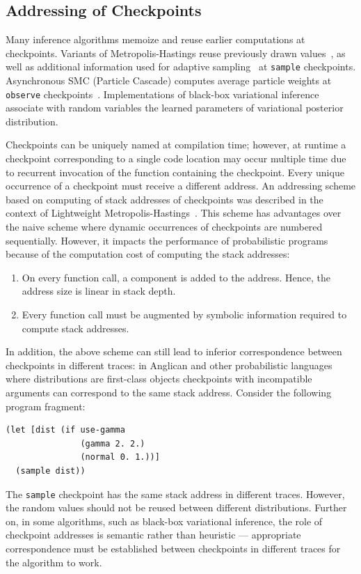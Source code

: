 \documentclass[preprint]{sigplanconf}
\begin{document}
\subsection{Addressing of Checkpoints}
\label{sec:addressing}

Many inference algorithms memoize and reuse earlier computations
at checkpoints. Variants of Metropolis-Hastings reuse previously
drawn values~\cite{WSG11}, as well as additional information
used for adaptive sampling~\cite{TMP+15} at \texttt{sample}
checkpoints. Asynchronous SMC (Particle Cascade) computes
average particle weights at \texttt{observe}
checkpoints~\cite{PWD+14}. Implementations of black-box
variational inference~\cite{WW13,MPT+16} associate with random
variables the learned parameters of variational posterior
distribution.

Checkpoints can be uniquely named at compilation time;
however, at runtime a checkpoint corresponding to a single code
location may occur multiple time due to recurrent invocation of
the function containing the checkpoint. Every unique occurrence
of a checkpoint must receive a different address. An addressing
scheme based on computing of stack addresses of checkpoints was
described in the context of Lightweight
Metropolis-Hastings~\cite{WSG11}.  This scheme has advantages
over the naive scheme where dynamic occurrences of checkpoints
are numbered sequentially. However, it impacts the
performance of probabilistic programs because of the computation
cost of computing the stack addresses:
\begin{enumerate}
    \item On every function call, a component is added to the
        address. Hence, the address size is linear in stack depth.
    \item Every function call must be augmented by symbolic
        information required to compute stack addresses.
\end{enumerate}
In addition, the above scheme can still lead to inferior
correspondence between checkpoints in different traces: in
Anglican and other probabilistic languages where distributions
are first-class objects checkpoints with incompatible arguments
can correspond to the same stack address. Consider the following
program fragment:
\begin{lstlisting}[style=default]
(let [dist (if use-gamma
               (gamma 2. 2.)
               (normal 0. 1.))]
  (sample dist))
\end{lstlisting}
The \texttt{sample} checkpoint has the same stack address in
different traces. However, the random values should not be
reused between different distributions. Further on, in some
algorithms, such as black-box variational inference, the role of
checkpoint addresses is semantic rather than heuristic ---
appropriate correspondence must be established
between checkpoints in different traces for the algorithm to
work.
\end{document}
